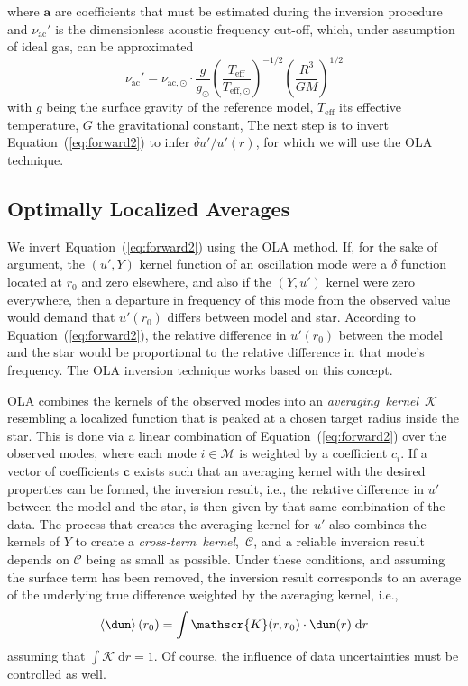 where $\mathbf a$ are coefficients that must be estimated during the inversion procedure and $\nu_{\text{ac}}'$ is the dimensionless acoustic frequency cut-off, which, under assumption of ideal gas, can be approximated  %
\begin{equation}
    \nu_{\text{ac}}' 
    = 
    \nu_{\text{ac},\odot} \cdot
    \frac{g}{g_{\odot}} 
    \left( 
        \frac{T_{\text{eff}}}{T_{\text{eff},\odot}} 
    \right)^{-1/2} 
    \left( 
        \frac{R^3}{G M} 
    \right)^{1/2}
\end{equation}
with $g$ being the surface gravity of the reference model, $T_{\text{eff}}$ its effective temperature, $G$ the gravitational constant,  
The next step is to invert Equation~(\ref{eq:forward2}) to infer ${\delta u'/u'(r)}$, for which we will use the OLA technique. 

%
%
%
%
\subsection{Optimally Localized Averages}
We invert Equation~(\ref{eq:forward2}) using the OLA method.
If, for the sake of argument, the ${(u',Y)}$ kernel function of an oscillation mode were a $\delta$ function located at $r_0$ and zero elsewhere, and also if the ${(Y,u')}$ kernel were zero everywhere, then a departure in frequency of this mode from the observed value would demand that ${u'(r_0)}$ differs between model and star. 
According to Equation~(\ref{eq:forward2}), the relative difference in ${u'(r_0)}$ between the model and the star would be proportional to the relative difference in that mode's frequency. The OLA inversion technique works based on this concept. 

OLA combines the kernels of the observed modes into an \emph{averaging~kernel}~$\mathscr{K}$ resembling a localized function that is peaked at a chosen target radius inside the star. 
This is done via a linear combination of Equation~(\ref{eq:forward2}) over the observed modes, where each mode ${i \in \mathscr{M}}$ is weighted by a coefficient $c_i$. 
If a vector of coefficients $\mathbf c$ exists such that an averaging kernel with the desired properties can be formed, the inversion result, i.e., the relative difference in $u'$ between the model and the star, is then given by that same combination of the data. 
The process that creates the averaging kernel for $u'$ also combines the kernels of $Y$ to create a \emph{cross-term~kernel},~$\mathscr{C}$, and a reliable inversion result depends on $\mathscr{C}$ being as small as possible. 
Under these conditions, and assuming the surface term has been removed, the inversion result corresponds to an average of the underlying true difference weighted by the averaging kernel, i.e.,
\begin{equation}
    \left\langle\dun\right\rangle(r_0)
    =
    \int{\mathscr{K}}(r,r_0)\cdot \dun(r) \; \text{d}r
\end{equation}
assuming that ${\int{\mathscr{K}}\;\text{d}r=1}$.
Of course, the influence of data uncertainties must  be controlled as well.


